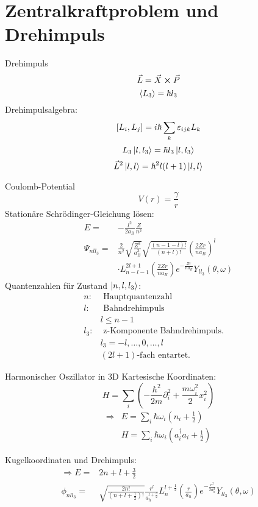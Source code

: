 \section{Zentralkraftproblem und Drehimpuls}

\begin{mainbox}{Drehimpuls}
\[ \vec{L} = \vec{X} \cross \vec{P} \]
\[\expval{L_3} = \hbar l_3\]
Drehimpulsalgebra:
\[\comm{L_i}{L_j} = i\hbar \sum_k \varepsilon_{ijk} L_k \]
\[L_3 \ket{l, l_3} = \hbar l_3 \ket{l, l_3} \]
\[\vec{L}^2 \ket{l, l} = \hbar^2 l(l+1) \ket{l, l} \]
\end{mainbox}

\begin{mainbox}{Coulomb-Potential}
\[ V(r) = \frac{\gamma}{r} \]
Stationäre Schrödinger-Gleichung lösen:
\begin{align*}
    E =& -\frac{l^2}{2a_B} \frac{Z}{n^2} \\
    \Psi_{nll_3} =& \frac{2}{n^2}\sqrt{\frac{Z^3}{a_B^3}}\sqrt{\frac{(n-1-l)!}{(n+l)!}} \left(\frac{2Zr}{na_B}\right)^l \\ & \cdot L_{n-l-1}^{2l+1}\left(\frac{2Zr}{na_B}\right) e^{-\frac{Zr}{na_B}}Y_{ll_3}(\theta, \omega)
\end{align*}
Quantenzahlen für Zustand $\ket{n, l, l_3}$:
\begin{align*}
    n: &\text{ Hauptquantenzahl} &\\
    l: &\text{ Bahndrehimpuls} &\\
    & l \leq n-1 &\\
    l_3: &\text{ z-Komponente Bahndrehimpuls. } &\\
    & l_3 = {-l, \dots , 0, \dots , l} &\\
    &(2l+1)\text{-fach entartet.}
\end{align*}
\end{mainbox}

\begin{mainbox}{Harmonischer Oszillator in 3D}
Kartesische Koordinaten:
\[ H = \sum_i \left( -\frac{\hbar^2}{2m}\partial_i ^2 + \frac{m\omega_i^2}{2}x_i^2\right) \]
\begin{align*}
    \Rightarrow & E = \sum_i \hbar \omega_i \left(n_i + \frac{1}{2}\right) \\
    & H = \sum_i \hbar \omega_i \left(a_i^\dag a_i + \frac{1}{2}\right)
\end{align*}

Kugelkoordinaten und Drehimpuls:
\begin{align*}
    \Rightarrow E =& 2n + l + \frac{3}{2} \\
     \phi_{nll_3} =& \sqrt{\frac{2n!}{(n+l+\frac{1}{2})!}} \frac{r^l}{a_h^{l+\frac{3}{2}}} L_n^{l+\frac{1}{2}} \left(\frac{r}{a_h}\right) e^{-\frac{r^2}{2a_h^2}} Y_{ll_3} (\theta, \omega)
\end{align*}
\end{mainbox}